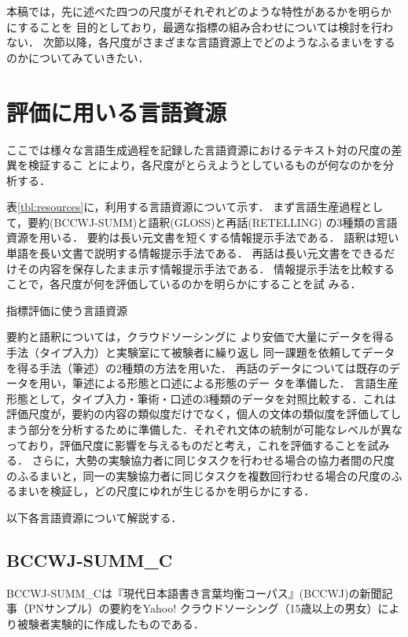 \documentclass[japanese]{jnlp_1.4}
\begin{document}
本稿では，先に述べた四つの尺度がそれぞれどのような特性があるかを明らかにすることを
目的としており，最適な指標の組み合わせについては検討を行わない．
次節以降，各尺度がさまざまな言語資源上でどのようなふるまいをするのかについてみていきたい．


\section{評価に用いる言語資源}

ここでは様々な言語生成過程を記録した言語資源におけるテキスト対の尺度の差異を検証するこ
とにより，各尺度がとらえようとしているものが何なのかを分析する．

表\ref{tbl:resources}に，利用する言語資源について示す．
まず言語生産過程として，要約(BCCWJ-SUMM)と語釈(GLOSS)と再話(RETELLING)
の3種類の言語資源を用いる．
要約は長い元文書を短くする情報提示手法である．
語釈は短い単語を長い文書で説明する情報提示手法である．
再話は長い元文書をできるだけその内容を保存したまま示す情報提示手法である．
情報提示手法を比較することで，各尺度が何を評価しているのかを明らかにすることを試
みる．

\begin{table}[t]
\caption{指標評価に使う言語資源}
\label{tbl:resources}

\end{table}

要約と語釈については，クラウドソーシングに
より安価で大量にデータを得る手法（タイプ入力）と実験室にて被験者に繰り返し
同一課題を依頼してデータを得る手法（筆述）の2種類の方法を用いた．
再話のデータについては既存のデータを用い，筆述による形態と口述による形態のデー
タを準備した．
言語生産形態として，タイプ入力・筆術・口述の3種類のデータを対照比較する．これは評価尺度が，要約の内容の類似度だけでなく，個人の文体の類似度を評価してしまう部分を分析するために準備した．それぞれ文体の統制が可能なレベルが異なっており，評価尺度に影響を与えるものだと考え，これを評価することを試みる．
さらに，大勢の実験協力者に同じタスクを行わせる場合の協力者間の尺度のふるまいと，同一の実験協力者に同じタスクを複数回行わせる場合の尺度のふるまいを検証し，どの尺度にゆれが生じるかを明らかにする．

以下各言語資源について解説する．


\subsection{BCCWJ-SUMM\_C}

BCCWJ-SUMM\_Cは『現代日本語書き言葉均衡コーパス』\cite{Maekawa-2014-LRE}(BCCWJ)の新聞記事（PNサンプル）の要約をYahoo! クラウドソーシング（15歳以上の男女）により被験者実験的に作成したもの\cite{asahara-2015-jclws7}である．
\end{document}
